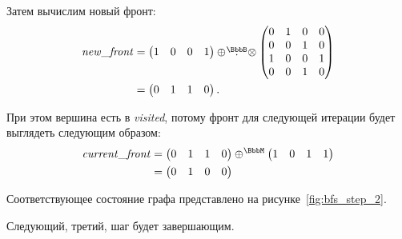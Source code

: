 \begin{example}
    Затем вычислим новый фронт:
    \begin{align*}
        \mathit{new\_front} & =
        \begin{pmatrix}
            1 & 0 & 0 & 1
        \end{pmatrix} \mmultFrom{\BbbB}
        \begin{pmatrix}
            0 & 1 & 0 & 0 \\
            0 & 0 & 1 & 0 \\
            1 & 0 & 0 & 1 \\
            0 & 0 & 1 & 0
        \end{pmatrix}        \\ &=
        \begin{pmatrix}
            0 & 1 & 1 & 0
        \end{pmatrix}.
    \end{align*}

    При этом вершина  есть в \emph{visited}, потому фронт для следующей итерации будет выглядеть следующим образом:
    \begin{align*}
        \mathit{current\_front} & =
        \begin{pmatrix}
            0 & 1 & 1 & 0
        \end{pmatrix} \opAddFrom{\BbbM}
        \begin{pmatrix}
            1 & 0 & 1 & 1
        \end{pmatrix}            \\ &=
        \begin{pmatrix}
            0 & 1 & 0 & 0
        \end{pmatrix}
    \end{align*}

    \begin{marginfigure}
        \begin{center}
            \resizebox{\marginparwidth}{!}{}
        \end{center}
        \caption{Обход в ширину, шаг второй}
        \label{fig:bfs_step_2}
    \end{marginfigure}

    Соответствующее состояние графа представлено на рисунке~\ref{fig:bfs_step_2}.

    Следующий, третий, шаг будет завершающим.


\end{example}
